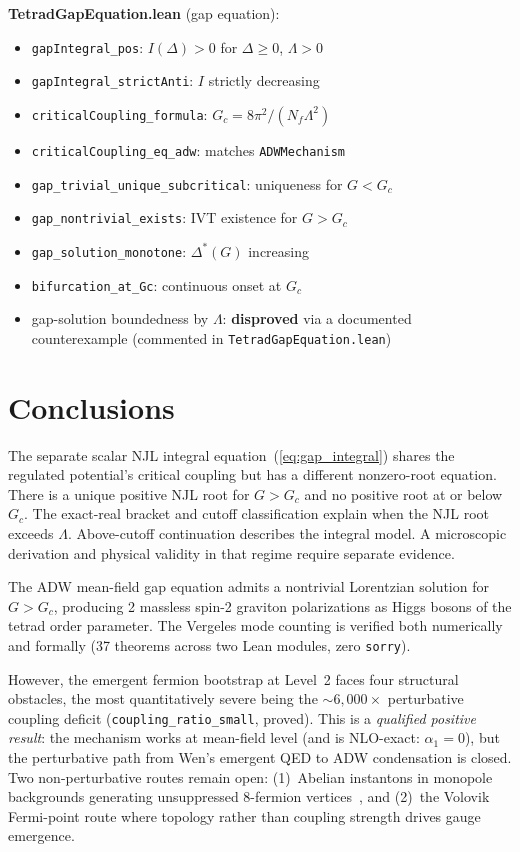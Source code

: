\documentclass[aps,prd,twocolumn,superscriptaddress,nofootinbib]{revtex4-2}
\begin{document}
\textbf{TetradGapEquation.lean} (gap equation):
\begin{itemize}
\item \texttt{gapIntegral\_pos}: $I(\Delta) > 0$ for $\Delta \geq 0$, $\Lambda > 0$
\item \texttt{gapIntegral\_strictAnti}: $I$ strictly decreasing
\item \texttt{criticalCoupling\_formula}: $G_c = 8\pi^2/(N_f \Lambda^2)$
\item \texttt{criticalCoupling\_eq\_adw}: matches \texttt{ADWMechanism}
\item \texttt{gap\_trivial\_unique\_subcritical}: uniqueness for $G < G_c$
\item \texttt{gap\_nontrivial\_exists}: IVT existence for $G > G_c$
\item \texttt{gap\_solution\_monotone}: $\Delta^*(G)$ increasing
\item \texttt{bifurcation\_at\_Gc}: continuous onset at $G_c$
\item gap-solution boundedness by $\Lambda$: \textbf{disproved} via a documented counterexample (commented in \texttt{TetradGapEquation.lean})
\end{itemize}

\section{Conclusions}

The separate scalar NJL integral equation~(\ref{eq:gap_integral}) shares
the regulated potential's critical coupling but has a different
nonzero-root equation. There is a unique positive NJL root for
$G>G_c$ and no positive root at or below $G_c$. The exact-real bracket and
cutoff classification explain when the NJL root exceeds $\Lambda$.
Above-cutoff continuation describes the integral model. A microscopic
derivation and physical validity in that regime require separate evidence.

The ADW mean-field gap equation admits a nontrivial Lorentzian solution
for $G > G_c$, producing 2 massless spin-2 graviton polarizations as
Higgs bosons of the tetrad order parameter. The Vergeles mode counting is
verified both numerically and formally (37 theorems across two Lean modules,
zero \texttt{sorry}).

However, the emergent fermion bootstrap at Level~2 faces four structural
obstacles, the most quantitatively severe being the ${\sim}6{,}000\times$
perturbative coupling deficit (\texttt{coupling\_ratio\_small}, proved).
This is a \emph{qualified positive result}: the mechanism works at
mean-field level (and is NLO-exact: $\alpha_1 = 0$), but the perturbative
path from Wen's emergent QED to ADW condensation is closed. Two non-perturbative
routes remain open: (1)~Abelian instantons in monopole backgrounds generating
unsuppressed 8-fermion vertices~\cite{Csaki2024}, and (2)~the Volovik
Fermi-point route where topology rather than coupling strength drives gauge
emergence.
\end{document}
